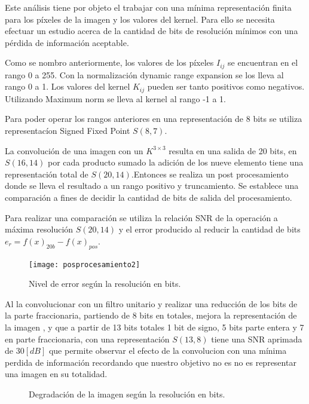 Este an\'alisis tiene por objeto el trabajar con una m\'inima representaci\'on
finita para los p\'ixeles de la imagen y los valores del kernel.
Para ello se necesita efectuar un estudio acerca de la cantidad de bits de
resoluci\'on m\'inimos  con una p\'erdida de informaci\'on aceptable.

Como se nombro anteriormente, los valores de los p\'ixeles \(I_{ij}\) se
encuentran en el rango 0 a 255. Con la normalización dynamic range
expansion se los lleva al rango 0 a 1. Los valores del kernel
\(K_{ij}\) pueden ser tanto positivos como negativos. Utilizando Maximum
norm se lleva al kernel al rango -1 a 1.

Para poder operar los rangos anteriores en una representaci\'on de 8 bits se
utiliza representac\'ion Signed Fixed Point\cite{fix_p} \(S(8,7)\). 

La convoluci\'on de una imagen con un $K^{3{\times}3}$ resulta en una 
salida de 20 bits, en \(S(16,14)\) por cada producto sumado la adici\'on de los nueve
elemento tiene una representaci\'on total de \(S(20,14)\).Entonces se realiza un
post procesamiento donde se lleva el resultado a un rango positivo y truncamiento.
Se establece una comparaci\'on a fines de decidir la cantidad de bits de salida del
procesamiento.

Para realizar una comparaci\'on se utiliza la relaci\'on SNR de la operaci\'on a
m\'axima resoluci\'on \(S(20,14)\) y el error producido al reducir la cantidad
de bits ${e_r=f(x)_{20b}-f(x)_{pos}}$\cite{srntesis}.

\begin{figure}
\centering
\texttt{[image: posprocesamiento2]}
\caption{Nivel de error según la resolución en bits.}
\label{prepro}
\end{figure}

Al la convolucionar con un filtro unitario y realizar una reducci\'on de los
bits de la parte fraccionaria, partiendo de 8 bits en totales, mejora la
representaci\'on de la imagen , y que a partir de 13 bits totales 1 bit de
signo, 5 bits parte entera y 7 en parte fraccionaria, con una representación
\(S(13,8)\) tiene una SNR aprimada de \(30 [dB]\) que permite observar el efecto
de la convolucion con una m\'inima perdida de informaci\'on recordando que
nuestro objetivo no es no es representar una imagen en su totalidad.

\begin{figure}[!t]
  \centering
    \hfil %
    \centering
      \caption{Degradación de la imagen según la resolución en bits.}
      \label{prepro2}
    \end{figure}

